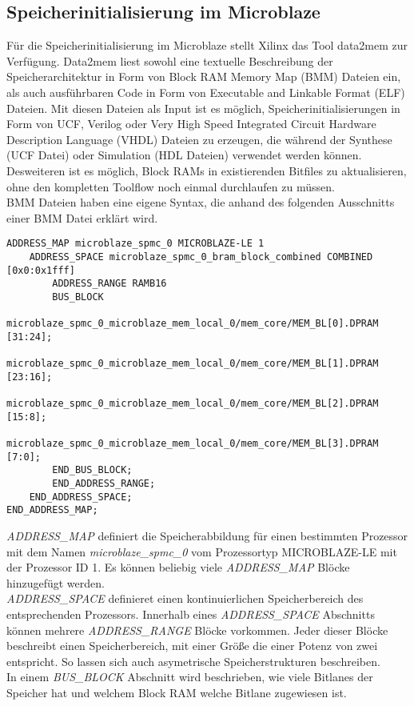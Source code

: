 \subsection{Speicherinitialisierung im Microblaze}
Für die Speicherinitialisierung im Microblaze stellt Xilinx das Tool data2mem zur Verfügung. %
Data2mem liest sowohl eine textuelle Beschreibung der Speicherarchitektur in Form von Block RAM Memory Map (BMM) Dateien ein, als auch ausführbaren Code in Form von Executable and Linkable Format (ELF) Dateien. Mit diesen Dateien als Input ist es möglich, Speicherinitialisierungen in Form von UCF, Verilog oder Very High Speed Integrated Circuit Hardware Description Language (VHDL) Dateien zu erzeugen, die während der Synthese (UCF Datei) oder Simulation (HDL Dateien) verwendet werden können. Desweiteren ist es möglich, Block RAMs in existierenden Bitfiles zu aktualisieren, ohne den kompletten Toolflow noch einmal durchlaufen zu müssen.\\
BMM Dateien haben eine eigene Syntax, die anhand des folgenden Ausschnitts einer BMM Datei erklärt wird.
\newpage
\begin{lstlisting}
ADDRESS_MAP microblaze_spmc_0 MICROBLAZE-LE 1
	ADDRESS_SPACE microblaze_spmc_0_bram_block_combined COMBINED [0x0:0x1fff]
		ADDRESS_RANGE RAMB16
		BUS_BLOCK
			microblaze_spmc_0_microblaze_mem_local_0/mem_core/MEM_BL[0].DPRAM [31:24];
			microblaze_spmc_0_microblaze_mem_local_0/mem_core/MEM_BL[1].DPRAM [23:16];
			microblaze_spmc_0_microblaze_mem_local_0/mem_core/MEM_BL[2].DPRAM [15:8];
			microblaze_spmc_0_microblaze_mem_local_0/mem_core/MEM_BL[3].DPRAM [7:0];
		END_BUS_BLOCK;
		END_ADDRESS_RANGE;
	END_ADDRESS_SPACE;
END_ADDRESS_MAP;
\end{lstlisting}
\textit{ADDRESS\_MAP} definiert die Speicherabbildung für einen bestimmten Prozessor mit dem Namen \textit{microblaze\_spmc\_0} vom Prozessortyp MICROBLAZE-LE mit der Prozessor ID 1. Es können beliebig viele \textit{ADDRESS\_MAP} Blöcke hinzugefügt werden.\\ \textit{ADDRESS\_SPACE} definieret einen kontinuierlichen Speicherbereich des entsprechenden Prozessors. Innerhalb eines \textit{ADDRESS\_SPACE} Abschnitts können mehrere \textit{ADDRESS\_RANGE} Blöcke vorkommen. Jeder dieser Blöcke beschreibt einen Speicherbereich, mit einer Größe die einer Potenz von zwei entspricht. So lassen sich auch asymetrische Speicherstrukturen beschreiben.\\
In einem \textit{BUS\_BLOCK} Abschnitt wird beschrieben, wie viele Bitlanes der Speicher hat und welchem Block RAM welche Bitlane zugewiesen ist.

